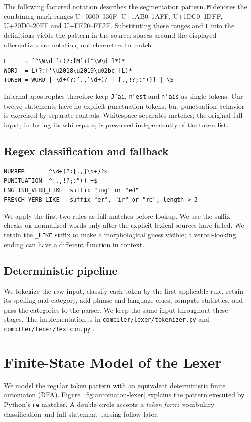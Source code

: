 \documentclass[11pt]{article}
\newcommand{\code}[1]{\texttt{#1}}
\begin{document}
The following factored notation describes the segmentation pattern.
\code{M} denotes the combining-mark ranges U+0300--036F, U+1AB0--1AFF,
U+1DC0--1DFF, U+20D0--20FF and U+FE20--FE2F. Substituting those ranges and
\code{L} into the definitions yields the pattern in the source; spaces around
the displayed alternatives are notation, not characters to match.
{\small
\begin{verbatim}
L     = [^\W\d_]+(?:[M]+[^\W\d_]*)*
WORD  = L(?:['\u2018\u2019\u02bc-]L)*
TOKEN = WORD | \d+(?:[.,]\d+)? | [.,!?;:"()] | \S
\end{verbatim}}

Internal apostrophes therefore keep \code{J'ai}, \code{n'est} and
\code{n'ais} as single tokens. Our twelve statements have no explicit
punctuation tokens, but punctuation behavior is exercised by separate controls.
Whitespace separates matches; the original full input, including its whitespace,
is preserved independently of the token list.

\subsection*{Regex classification and fallback}
{\small
\begin{verbatim}
NUMBER       ^\d+(?:[.,]\d+)?$
PUNCTUATION  ^[.,!?;:"()]+$
ENGLISH_VERB_LIKE  suffix "ing" or "ed"
FRENCH_VERB_LIKE   suffix "er", "ir" or "re", length > 3
\end{verbatim}}

We apply the first two rules as full matches before lookup. We use the suffix
checks on normalized words only after the explicit lexical sources have
failed. We retain the \code{\_LIKE} suffix to make a morphological guess
visible; a verbal-looking ending can have a different function in context.

\subsection*{Deterministic pipeline}
We tokenize the raw input, classify each token by the first applicable rule,
retain its spelling and category, add phrase and language clues, compute
statistics, and pass the categories to the parser. We keep the same input
throughout these stages. The implementation is in
\nolinkurl{compiler/lexer/tokenizer.py} and
\nolinkurl{compiler/lexer/lexicon.py} \cite{source}.

\clearpage
\section{Finite-State Model of the Lexer}
We model the regular token pattern with an equivalent deterministic finite
automaton (DFA). Figure~\ref{fig:automaton-lexer} explains the pattern executed
by Python's \code{re} matcher. A double circle accepts a \emph{token form};
vocabulary classification and full-statement parsing follow later.
\end{document}
